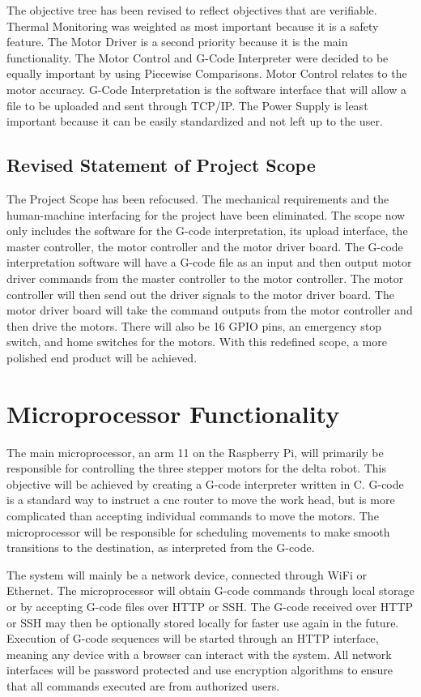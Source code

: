 The objective tree has been revised to reflect objectives that are verifiable.
Thermal Monitoring was weighted as most important because it is a safety feature.
The Motor Driver is a second priority because it is the main functionality.
The Motor Control and G-Code Interpreter were decided to be equally important by using Piecewise Comparisons.
Motor Control relates to the motor accuracy.
G-Code Interpretation is the software interface that will allow a file to be uploaded and sent through TCP/IP.
The Power Supply is least important because it can be easily standardized and not left up to the user.
\subsection{Revised Statement of Project Scope}
The Project Scope has been refocused. 
The mechanical requirements and the human-machine interfacing for the project have been eliminated.
The scope now only includes the software for the G-code interpretation, its upload interface, the master controller, the motor controller and the motor driver board.
The G-code interpretation software will have a G-code file as an input and then output motor driver commands from the master controller to the motor controller.
The motor controller will then send out the driver signals to the motor driver board. 
The motor driver board will take the command outputs from the motor controller and then drive the motors. 
There will also be 16 GPIO pins, an emergency stop switch, and home switches for the motors. 
With this redefined scope, a more polished end product will be achieved. 
\section{Microprocessor Functionality}
The main microprocessor, an \gls{arm} 11 on the Raspberry Pi, will primarily be responsible for controlling the three stepper motors for the delta robot.
This objective will be achieved by creating a G-code interpreter written in C.
G-code is a standard way to instruct a \gls{cnc} router to move the work head, but is more complicated than accepting individual commands to move the motors.
The microprocessor will be responsible for scheduling movements to make smooth transitions to the destination, as interpreted from the G-code.

The system will mainly be a network device, connected through WiFi or Ethernet.
The microprocessor will obtain G-code commands through local storage or by accepting G-code files over HTTP or SSH.
The G-code received over HTTP or SSH may then be optionally stored locally for faster use again in the future.
Execution of G-code sequences will be started through an HTTP interface, meaning any device with a browser can interact with the system.
All network interfaces will be password protected and use encryption algorithms to ensure that all commands executed are from authorized users. 

